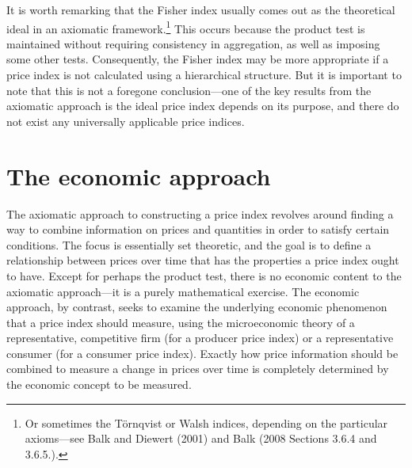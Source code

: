 \documentclass[]{article}
\begin{document}
It is worth remarking that the Fisher index usually comes out as the theoretical ideal in an axiomatic framework.\footnote{Or sometimes the Törnqvist or Walsh indices, depending on the particular axioms---see Balk and Diewert (2001) and Balk (2008 Sections 3.6.4 and 3.6.5.).} This occurs because the product test is maintained without requiring consistency in aggregation, as well as imposing some other tests. Consequently, the Fisher index may be more appropriate if a price index is not calculated using a hierarchical structure. But it is important to note that this is not a foregone conclusion---one of the key results from the axiomatic approach is the ideal price index depends on its purpose, and there do not exist any universally applicable price indices.

\hypertarget{the-economic-approach}{%
\section{The economic approach}\label{the-economic-approach}}

The axiomatic approach to constructing a price index revolves around finding a way to combine information on prices and quantities in order to satisfy certain conditions. The focus is essentially set theoretic, and the goal is to define a relationship between prices over time that has the properties a price index ought to have. Except for perhaps the product test, there is no economic content to the axiomatic approach---it is a purely mathematical exercise. The economic approach, by contrast, seeks to examine the underlying economic phenomenon that a price index should measure, using the microeconomic theory of a representative, competitive firm (for a producer price index) or a representative consumer (for a consumer price index). Exactly how price information should be combined to measure a change in prices over time is completely determined by the economic concept to be measured.
\end{document}
